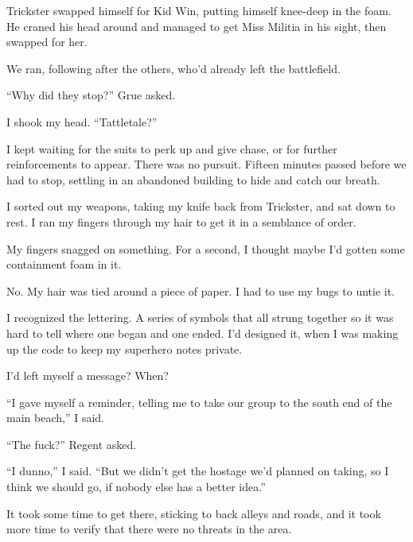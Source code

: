 Trickster swapped himself for Kid Win, putting himself knee-deep in the foam.  He craned his head around and managed to get Miss Militia in his sight, then swapped for her.



We ran, following after the others, who'd already left the battlefield.



``Why did they stop?'' Grue asked.



I shook my head.  ``Tattletale?''



I kept waiting for the suits to perk up and give chase, or for further reinforcements to appear.  There was no pursuit.  Fifteen minutes passed before we had to stop, settling in an abandoned building to hide and catch our breath.



I sorted out my weapons, taking my knife back from Trickster, and sat down to rest.  I ran my fingers through my hair to get it in a semblance of order.



My fingers snagged on something.  For a second, I thought maybe I'd gotten some containment foam in it.



No.  My hair was tied around a piece of paper.  I had to use my bugs to untie it.



I recognized the lettering.  A series of symbols that all strung together so it was hard to tell where one began and one ended.  I'd designed it, when I was making up the code to keep my superhero notes private.



I'd left myself a message?  When?



``I gave myself a reminder, telling me to take our group to the south end of the main beach,'' I said.



``The fuck?'' Regent asked.



``I dunno,'' I said.  ``But we didn't get the hostage we'd planned on taking, so I think we should go, if nobody else has a better idea.''



\blacksquare



It took some time to get there, sticking to back alleys and roads, and it took more time to verify that there were no threats in the area.



